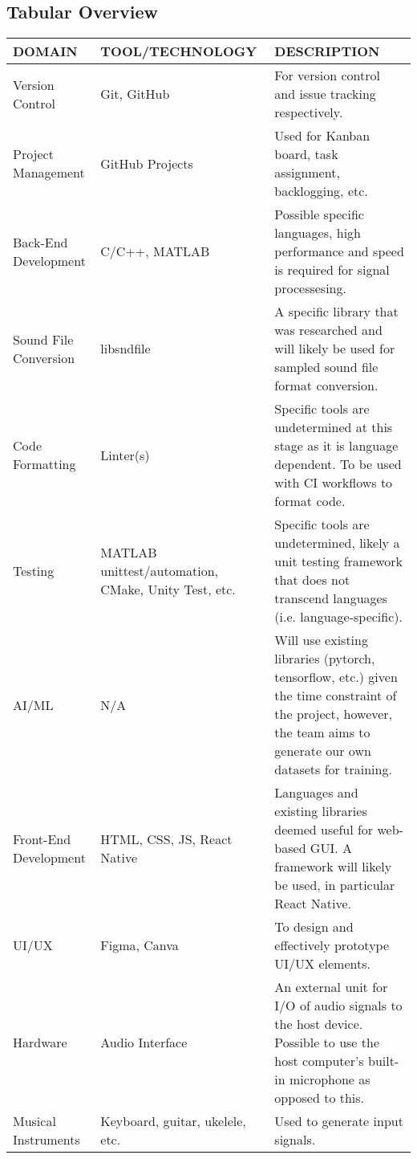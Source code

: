 \documentclass{article}
\begin{document}
\subsection{Tabular Overview}
\begingroup
\renewcommand{\arraystretch}{1.25}
\begin{tabular}{|>{\raggedright}p{3cm}|>{\raggedright}p{4.25cm}|>{\raggedright\arraybackslash}p{6cm}|}
  \hline
  DOMAIN & TOOL/TECHNOLOGY & DESCRIPTION \\
  \hline
  Version Control & Git, GitHub & For version control and issue tracking respectively.\\
  \hline
  Project Management & GitHub Projects & Used for Kanban board, task assignment, backlogging, etc. \\
  \hline
  Back-End Development & C/C++, MATLAB & Possible specific languages, high performance and speed is required for
  signal processesing.\\
  \hline
  Sound File Conversion & libsndfile  & A specific library that was researched and will likely be used
  for sampled sound file format conversion.\\
  \hline
  Code Formatting & Linter(s) &  Specific tools are undetermined at this stage as it is language dependent. 
  To be used with CI workflows to format code.\\
  \hline
  Testing & MATLAB unittest/automation, CMake, Unity Test, etc.  & Specific tools are undetermined, likely a unit testing framework
  that does not transcend languages (i.e. language-specific).
  \\
  \hline
  AI/ML & N/A & Will use existing libraries (pytorch, tensorflow, etc.) given the time constraint of the project, however,
  the team aims to generate our own datasets for training.\\
  \hline
  Front-End Development & HTML, CSS, JS, React Native & Languages and existing libraries deemed useful for web-based
  GUI. A framework will likely be used, in particular React Native.\\
  \hline
  UI/UX & Figma, Canva & To design and effectively prototype UI/UX elements.\\
  \hline
  Hardware & Audio Interface & An external unit for I/O of audio signals to the host device. Possible to use the host computer's 
  built-in microphone as opposed to this. \\
  \hline
  Musical Instruments & Keyboard, guitar, ukelele, etc. & Used to generate input signals.\\
  \hline
\end{tabular}
\endgroup
\end{document}
